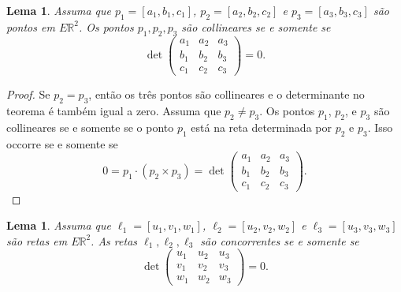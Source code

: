 \documentclass[12pt]{amsart}
\newcommand{\R}{\mathbb R}
\newtheorem{lemma}[theorem]{Lema}
\theoremstyle{definition}
\begin{document}
\begin{lemma}
    Assuma que $p_1=[a_1,b_1,c_1]$, $p_2=[a_2,b_2,c_2]$ e $p_3=[a_3,b_3,c_3]$ são pontos em $E\R^2$. 
    Os pontos $p_1,p_2,p_3$ são collineares se e somente se
    \[
        \det\begin{pmatrix} a_1 & a_2 & a_3\\ b_1 & b_2 & b_3\\ c_1 & c_2 & c_3\end{pmatrix}=0.
    \]
\end{lemma}
\begin{proof}
    Se $p_2=p_3$, então os três pontos são collineares e o determinante no teorema é também igual a zero. 
    Assuma que $p_2\neq p_3$.
    Os pontos $p_1$, $p_2$, e $p_3$ são collineares se e somente se o ponto $p_1$ está na reta determinada 
    por $p_2$ e $p_3$. Isso occorre se e somente se 
    \[
        0=p_1\cdot (p_2\times p_3)=\det\begin{pmatrix} a_1 & a_2 & a_3\\ b_1 & b_2 & b_3\\ c_1 & c_2 & c_3\end{pmatrix}.
    \]
\end{proof}

\begin{lemma}
    Assuma que $\ell_1=[u_1,v_1,w_1]$, $\ell_2=[u_2,v_2,w_2]$ e $\ell_3=[u_3,v_3,w_3]$ são retas em $E\R^2$. 
    As retas $\ell_1,\ell_2,\ell_3$ são concorrentes se e somente se
    \[
        \det\begin{pmatrix} u_1 & u_2 & u_3\\ v_1 & v_2 & v_3\\ w_1 & w_2 & w_3\end{pmatrix}=0.
    \]
\end{lemma}
\end{document}
